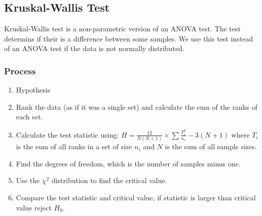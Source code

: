     \newpage
    \subsection{Kruskal-Wallis Test}
        Kruskal-Wallis test is a non-parametric version of an ANOVA test. The test determins if their is a difference between some samples. We use this test instead of an ANOVA test if the data is not normally distributed.

        \subsubsection{Process}
            \begin{enumerate}
            \item Hypothesis
            \item Rank the data (as if it was a single set) and calculate the sum of the ranks of each set.
            \item Calculate the test statistic using: $H = \displaystyle\frac{12}{N(N + 1)} \times \displaystyle\sum{\frac{T_i^2}{n_i}} - 3(N + 1)$ where $T_i$ is the sum of all ranks in a set of size $n_i$ and $N$ is the sum of all sample sizes.
            \item Find the degrees of freedom, which is the number of samples minus one.
            \item Use the $\chi^2$ distribution to find the critical value.
            \item Compare the test statistic and critical value, if statistic is larger than critical value reject $H_0$.
            \end{enumerate}

